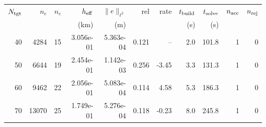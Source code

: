 \begin{tabular}{rrrrrrrrrrr}
\hline
$N_{\rm tgt}$ & $n_e$ & $n_c$ & $h_{\rm eff}$ & $\|e\|_{\ell^2}$ & rel & rate & $t_{\rm build}$ & $t_{\rm solve}$ & $n_{\rm acc}$ & $n_{\rm rej}$ \\
 & & & (km) & (m) & & & (s) & (s) & & \\
\hline
40 & 4284 & 15 & 3.056e-01 & 5.363e-04 & 0.121 & -- & 2.0 & 101.8 & 1 & 0 \\
50 & 6644 & 19 & 2.454e-01 & 1.142e-03 & 0.256 & -3.45 & 3.3 & 131.3 & 1 & 0 \\
60 & 9462 & 22 & 2.056e-01 & 5.083e-04 & 0.114 & 4.58 & 5.3 & 186.3 & 1 & 0 \\
70 & 13070 & 25 & 1.749e-01 & 5.276e-04 & 0.118 & -0.23 & 8.0 & 245.8 & 1 & 0 \\
\hline
\end{tabular}
